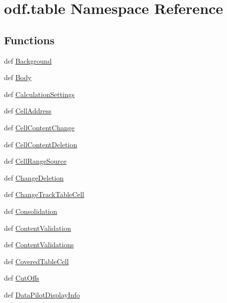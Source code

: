 \hypertarget{namespaceodf_1_1table}{\section{odf.\+table Namespace Reference}
\label{namespaceodf_1_1table}
}
\subsection*{Functions}
\begin{DoxyCompactItemize}
\item 
def \hyperlink{namespaceodf_1_1table_a76b96bb526d3b1f4fe3d240c23cfba7e}{Background}
\item 
def \hyperlink{namespaceodf_1_1table_a4ef799c82f131dafe9af7dd424acbbca}{Body}
\item 
def \hyperlink{namespaceodf_1_1table_ae81b90fede66044b8a37b6bc08ab2283}{Calculation\+Settings}
\item 
def \hyperlink{namespaceodf_1_1table_a230b54ea73081d99017fac071c741bbb}{Cell\+Address}
\item 
def \hyperlink{namespaceodf_1_1table_a1be3095f624a4d778945120f334c2ae7}{Cell\+Content\+Change}
\item 
def \hyperlink{namespaceodf_1_1table_a140e3f577c50336df3861ac5a7699538}{Cell\+Content\+Deletion}
\item 
def \hyperlink{namespaceodf_1_1table_a944dc4670a49d5c7c5fd5ee364d6afd6}{Cell\+Range\+Source}
\item 
def \hyperlink{namespaceodf_1_1table_a7eb1320f53afb109dc4fdf3fc673764c}{Change\+Deletion}
\item 
def \hyperlink{namespaceodf_1_1table_a158309b2772da2e2c309431cfe7b998d}{Change\+Track\+Table\+Cell}
\item 
def \hyperlink{namespaceodf_1_1table_a2d0345dcc58ea6f8c9fbc73a67993d9f}{Consolidation}
\item 
def \hyperlink{namespaceodf_1_1table_ac128fbda8468533e44a69526fa0e6f5f}{Content\+Validation}
\item 
def \hyperlink{namespaceodf_1_1table_a2b0098b54635d1a6a30266ff3f17a86a}{Content\+Validations}
\item 
def \hyperlink{namespaceodf_1_1table_a5a52160e0b70b30919dd6ea0fff941b6}{Covered\+Table\+Cell}
\item 
def \hyperlink{namespaceodf_1_1table_a3df4e497419f7c47affe7990a866ebd1}{Cut\+Offs}
\item 
def \hyperlink{namespaceodf_1_1table_a1cc062e8efb974a53c24783464791e48}{Data\+Pilot\+Display\+Info}

\end{DoxyCompactItemize}
